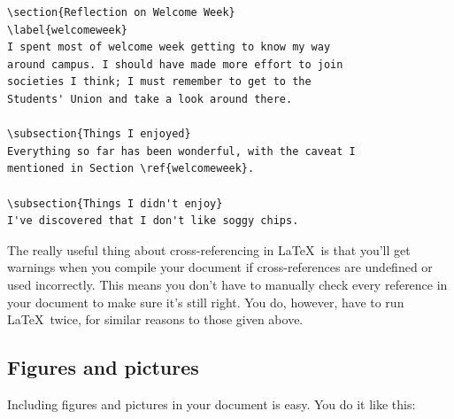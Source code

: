\begin{refsection}
\begin{verbatim}
\section{Reflection on Welcome Week}
\label{welcomeweek}
I spent most of welcome week getting to know my way
around campus. I should have made more effort to join
societies I think; I must remember to get to the
Students' Union and take a look around there.

\subsection{Things I enjoyed}
Everything so far has been wonderful, with the caveat I 
mentioned in Section \ref{welcomeweek}.

\subsection{Things I didn't enjoy}
I've discovered that I don't like soggy chips.
\end{verbatim}

The really useful thing about cross-referencing in \LaTeX\ is that you'll get warnings when you compile your document if cross-references are undefined or used incorrectly. This means you don't have to manually check every reference in your document to make sure it's still right. You do, however, have to run \LaTeX\ twice, for similar reasons to those given above.

\subsection{Figures and pictures}

Including figures and pictures in your document is easy. You do it like this:


\end{refsection}
